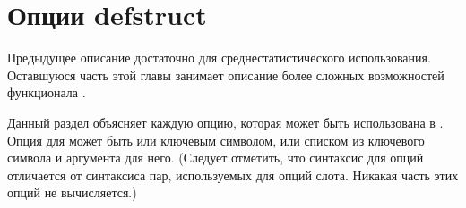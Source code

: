 \section{Опции defstruct}
\label{DEFSTRUCT-OPTIONS}
\label{Defstruct-Hairy-Stuff}

Предыдущее описание  достаточно для среднестатистического
использования. Оставшуюся часть этой главы занимает описание более сложных
возможностей функционала .

Данный раздел объясняет каждую опцию, которая может быть использована в
.
Опция для  может быть или ключевым символом, или списком из
ключевого символа и аргумента для него.
(Следует отметить, что синтаксис для опций  отличается от
синтаксиса пар, используемых для опций слота. Никакая часть этих опций не
вычисляется.)

